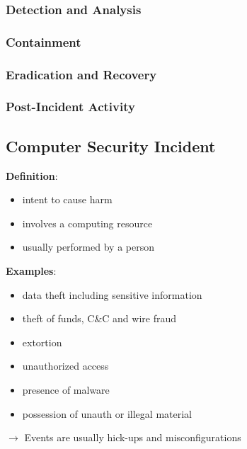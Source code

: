 \subsubsection{Detection and Analysis}
\subsubsection{Containment}
\subsubsection{Eradication and Recovery}
\subsubsection{Post-Incident Activity}
\subsection{}
\subsection{}
\subsection{}
\subsection{}
\subsection{}
\subsection{}


\subsection{Computer Security Incident}
\textbf{Definition}:
\begin{itemize}
    \item intent to cause harm
    \item involves a computing resource
    \item usually performed by a person\\
\end{itemize}

\textbf{Examples}:
\begin{itemize}
    \item data theft including sensitive information
    \item theft of funds, C\&C and wire fraud
    \item extortion
    \item unauthorized access
    \item presence of malware
    \item possession of unauth or illegal material\\
\end{itemize}
$\rightarrow$ Events are usually hick-ups and misconfigurations

